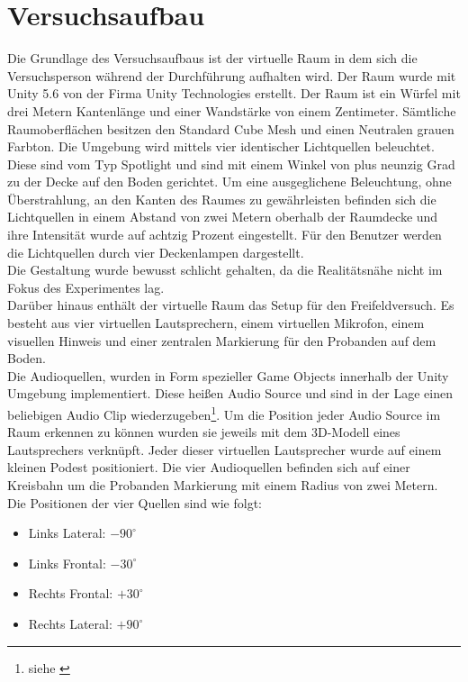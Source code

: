 
\section{Versuchsaufbau}
Die Grundlage des Versuchsaufbaus ist der virtuelle Raum in dem sich die Versuchsperson während der Durchführung aufhalten wird. Der Raum wurde mit Unity 5.6 von der Firma Unity Technologies erstellt.%
Der Raum ist ein Würfel mit drei Metern Kantenlänge und einer Wandstärke von einem Zentimeter. Sämtliche Raumoberflächen besitzen den Standard Cube Mesh und einen Neutralen grauen Farbton. Die Umgebung wird mittels vier identischer Lichtquellen beleuchtet. Diese sind vom Typ Spotlight und sind mit einem Winkel von plus neunzig Grad zu der Decke auf den Boden gerichtet. Um eine ausgeglichene Beleuchtung, ohne Überstrahlung, an den Kanten des Raumes zu gewährleisten befinden sich die Lichtquellen in einem Abstand von zwei Metern oberhalb der Raumdecke und ihre Intensität wurde auf achtzig Prozent eingestellt. Für den Benutzer werden die Lichtquellen durch vier Deckenlampen dargestellt.\\
Die Gestaltung wurde bewusst schlicht gehalten, da die Realitätsnähe nicht im Fokus des Experimentes lag.\\
Darüber hinaus enthält der virtuelle Raum das Setup für den Freifeldversuch.
Es besteht aus vier virtuellen Lautsprechern, einem virtuellen Mikrofon, einem visuellen Hinweis und einer zentralen Markierung für den Probanden auf dem Boden.\\
Die Audioquellen, wurden in Form spezieller Game Objects innerhalb der Unity Umgebung implementiert. Diese heißen Audio  Source und sind in der Lage einen beliebigen Audio Clip wiederzugeben\footnote{siehe \cite{UnityManualAudioSource}}.%
Um die Position jeder Audio Source im Raum erkennen zu können wurden sie jeweils mit dem 3D-Modell eines Lautsprechers verknüpft. Jeder dieser virtuellen Lautsprecher  wurde auf einem kleinen Podest positioniert. Die vier Audioquellen befinden sich auf einer Kreisbahn um die Probanden Markierung mit einem Radius von zwei Metern.\\
Die Positionen der vier Quellen sind wie folgt:
\begin{itemize}
\item Links Lateral: $-90^{\circ}$
\item Links Frontal: $-30^{\circ}$
\item Rechts Frontal: $+30^{\circ}$
\item Rechts Lateral: $+90^{\circ}$
\end{itemize}

